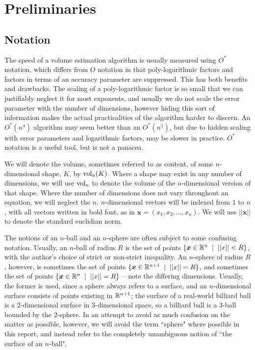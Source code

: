 \section{Preliminaries}
\subsection{Notation}

The speed of a volume estimation algorithm is usually measured using $O^{*}$ notation, which differs from $O$ notation in that poly-logarithmic factors and factors in terms of an accuracy parameter are suppressed. This has both benefits and drawbacks. The scaling of a poly-logarithmic factor is so small that we can justifiably neglect it for most exponents, and usually we do not scale the error parameter with the number of dimensions, however hiding this sort of information makes the actual practicalities of the algorithm harder to discern. An $O^{*}(n^4)$ algorithm may seem better than an $O^{*}(n^5)$, but due to hidden scaling with error parameters and logarithmic factors, may be slower in practice. $O^{*}$ notation is a useful tool, but is not a panacea.

We will denote the volume, sometimes referred to as content\cite{mathworld_content}, of some $n$-dimensional shape, $K$, by $\mbox{vol}_n(K)$. Where a shape may exist in any number of dimensions, we will use $\mbox{vol}_n$ to denote the volume of the $n$-dimensional version of that shape. Where the number of dimensions does not vary throughout an equation, we will neglect the $n$. $n$-dimensional vectors will be indexed from $1$ to $n$, with all vectors written in bold font, as in ${\bm x} = (x_1, x_2, ..., x_n)$. We will use $||{\bm x}||$ to denote the standard euclidian norm.

The notions of an $n$-ball\cite{mathworld_ball} and an $n$-sphere\cite{mathworld_sphere} are often subject to some confusing notation. Usually, an $n$-ball of radius $R$ is the set of points $\{{\bm x} \in \mathbb{R}^n  \;\; | \;\; ||{\bm x}|| < R \}$, with the author's choice of strict or non-strict inequality. An $n$-sphere of radius $R$, however, is sometimes the set of points $\{{\bm x} \in \mathbb{R}^{n+1}  \;\; | \;\; ||{\bm x}|| = R \}$, and sometimes the set of points $\{{\bm x} \in \mathbb{R}^{n}  \;\; | \;\; ||{\bm x}|| = R \}$ -- note the differing dimensions. Usually, the former is used, since a sphere always refers to a surface, and an $n$-dimensional surface consists of points existing in $\mathbb{R}^{n+1}$; the surface of a real-world billiard ball is a 2-dimensional surface in 3-dimensional space, so a billiard ball is a 3-ball bounded by the 2-sphere. In an attempt to avoid as much confusion on the matter as possible, however, we will avoid the term ``sphere" where possible in this report, and instead refer to the completely unambiguous notion of ``the surface of an $n$-ball".

